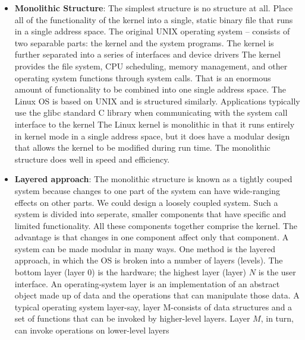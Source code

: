 \documentclass{report}
\begin{document}
\begin{itemize}
            \bigbreak \noindent 
            Partition a task into smaller components, or modules, rather than have one single system. Each module should be a well-defined portion of the system.
        \item \textbf{Monolithic Structure}: The simplest structure is no structure at all. Place all of the functionality of the kernel into a single, static binary file that runs in a single address space. 
            \bigbreak \noindent 
            The original UNIX operating system – consists of two separable parts: the kernel and the system programs. The kernel is further separated into a series of interfaces and device drivers
            \bigbreak \noindent 
            The kernel provides the file system, CPU scheduling, memory management, and other operating system functions through system calls. That is an enormous amount of functionality to be combined into one single address space.
            \bigbreak \noindent 
            The Linux OS is based on UNIX and is structured similarly. Applications typically use the glibc standard C library when communicating with the system call interface to the kernel
            \bigbreak \noindent 
            The Linux kernel is monolithic in that it runs entirely in kernel mode in a single address space, but it does have a modular design that allows the kernel to be modified during run time. The monolithic structure does well in speed and efficiency.
        \item \textbf{Layered approach}: The monolithic structure is known as a tightly couped system because changes to one part of the system can have wide-ranging effects on other parts. We could design a loosely coupled system. Such a system is divided into seperate, smaller components that have specific and limited functionality. All these components together comprise the kernel. The advantage is that changes in one component affect only that component.
            \bigbreak \noindent 
            A system can be made modular in many ways. One method is the layered approach, in which the OS is broken into a number of layers (levels). The bottom layer (layer 0) is the hardware; the highest layer (layer) $N$ is the user interface.
            \bigbreak \noindent 
            An operating-system layer is an implementation of an abstract object made up of data and the operations that can manipulate those data. A typical operating system layer-say, layer M-consists of data structures and a set of functions that can be invoked by higher-level layers. Layer $M$, in turn, can invoke operations on lower-level layers

\end{itemize}
\end{document}
